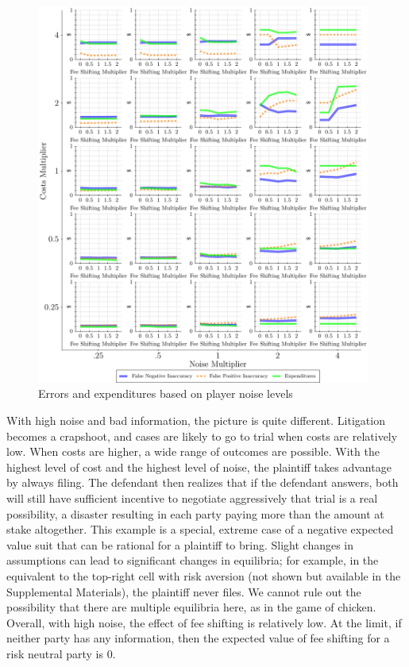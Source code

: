 \documentclass{article}
\begin{document}
\begin{figure}
\begin{minipage}{0.48\textwidth}
        \includegraphics[width=0.98\textwidth, scale=0.70, trim={0in 0in 0in 0in}, clip]{../Figures/Accuracy and Expenditures Varying Noise Multiplier} %
        \caption{Errors and expenditures based on player noise levels}
		\label{fig:accexp_playernoise}
    \end{minipage}
\end{figure}

With high noise and bad information, the picture is quite different. Litigation becomes a crapshoot, and cases are likely to go to trial when costs are relatively low. When costs are higher, a wide range of outcomes are possible. With the highest level of cost and the highest level of noise, the plaintiff takes advantage by always filing. The defendant then realizes that if the defendant answers, both will still have sufficient incentive to negotiate aggressively that trial is a real possibility, a disaster resulting in each party paying more than the amount at stake altogether. This example is a special, extreme case of a negative expected value suit that can be rational for a plaintiff to bring. Slight changes in assumptions can lead to significant changes in equilibria; for example, in the equivalent to the top-right cell with risk aversion (not shown but available in the Supplemental Materials), the plaintiff never files. We cannot rule out the possibility that there are multiple equilibria here, as in the game of chicken. Overall, with high noise, the effect of fee shifting is relatively low. At the limit, if neither party has any information, then the expected value of fee shifting for a risk neutral party is 0.  
\end{document}
